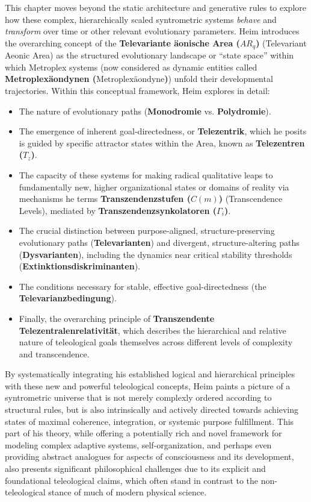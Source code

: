 \documentclass[
    12pt,              %
    a4paper,           %
    headings=normal,   %
    twoside=true,      %
    BCOR=8mm,          %
]{scrbook}
\newcommand{\q}[1]{\enquote{#1}}
\newcommand{\metroplexaeondyne}{\text{Metroplexäondyne}}
\newcommand{\telezentrum}{T_z}
\newcommand{\aeonischearea}{AR_q}
\newcommand{\transzendenzstufe}[1]{C(#1)}
\newcommand{\transzendenzsynkolator}{\Gamma_i}
\begin{document}
This chapter moves beyond the static architecture and generative rules to explore how these complex, hierarchically scaled syntrometric systems \textit{behave} and \textit{transform} over time or other relevant evolutionary parameters. Heim introduces the overarching concept of the \textbf{Televariante äonische Area (\(\aeonischearea\))} (Televariant Aeonic Area) as the structured evolutionary landscape or \q{state space} within which Metroplex systems (now considered as dynamic entities called \textbf{Metroplexäondynen (\(\metroplexaeondyne\))}) unfold their developmental trajectories. Within this conceptual framework, Heim explores in detail:
\begin{itemize}
    \item   The nature of evolutionary paths (\textbf{Monodromie} vs. \textbf{Polydromie}).
    \item   The emergence of inherent goal-directedness, or \textbf{Telezentrik}, which he posits is guided by specific attractor states within the Area, known as \textbf{Telezentren (\(\telezentrum\))}.
    \item   The capacity of these systems for making radical qualitative leaps to fundamentally new, higher organizational states or domains of reality via mechanisms he terms \textbf{Transzendenzstufen (\(\transzendenzstufe{m}\))} (Transcendence Levels), mediated by \textbf{Transzendenzsynkolatoren (\(\transzendenzsynkolator\))}.
    \item   The crucial distinction between purpose-aligned, structure-preserving evolutionary paths (\textbf{Televarianten}) and divergent, structure-altering paths (\textbf{Dysvarianten}), including the dynamics near critical stability thresholds (\textbf{Extinktionsdiskriminanten}).
    \item   The conditions necessary for stable, effective goal-directedness (the \textbf{Televarianzbedingung}).
    \item   Finally, the overarching principle of \textbf{Transzendente Telezentralenrelativität}, which describes the hierarchical and relative nature of teleological goals themselves across different levels of complexity and transcendence.
\end{itemize}
By systematically integrating his established logical and hierarchical principles with these new and powerful teleological concepts, Heim paints a picture of a syntrometric universe that is not merely complexly ordered according to structural rules, but is also intrinsically and actively directed towards achieving states of maximal coherence, integration, or systemic purpose fulfillment. This part of his theory, while offering a potentially rich and novel framework for modeling complex adaptive systems, self-organization, and perhaps even providing abstract analogues for aspects of consciousness and its development, also presents significant philosophical challenges due to its explicit and foundational teleological claims, which often stand in contrast to the non-teleological stance of much of modern physical science.
\end{document}

